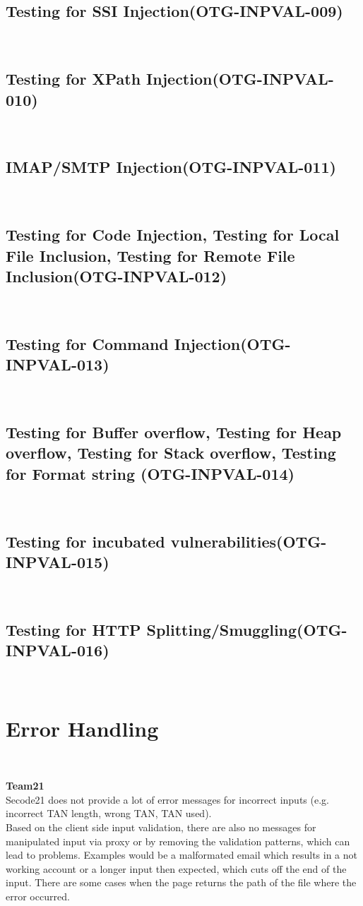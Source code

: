 \documentclass[headsepline,footsepline,footinclude=false,oneside,fontsize=11pt,paper=a4,listof=totoc,bibliography=totoc]{scrbook} %
\begin{document}
\subsection{Testing for SSI Injection(OTG-INPVAL-009)}\
\pagebreak
\subsection{Testing for XPath Injection(OTG-INPVAL-010)}\
\pagebreak
\subsection{IMAP/SMTP Injection(OTG-INPVAL-011)}\
\pagebreak
\subsection{Testing for Code Injection, Testing for Local File Inclusion, Testing for Remote File Inclusion(OTG-INPVAL-012)}\
\pagebreak
\subsection{Testing for Command Injection(OTG-INPVAL-013)}\
\pagebreak
\subsection{Testing for Buffer overflow, Testing for Heap overflow, Testing for Stack overflow, Testing for Format string (OTG-INPVAL-014)}\
\pagebreak
\subsection{Testing for incubated vulnerabilities(OTG-INPVAL-015)}\
\pagebreak
\subsection{Testing for HTTP Splitting/Smuggling(OTG-INPVAL-016)}\

\section{Error Handling}\

\textbf{Team21}\\

Secode21 does not provide a lot of error messages for incorrect inputs (e.g. incorrect TAN
length, wrong TAN, TAN used). \\
Based on the client side input validation, there are also no messages for manipulated input
via proxy or by removing the validation patterns, which can lead to problems. Examples would
be a malformated email which results in a not working account or a longer input then expected,
which cuts off the end of the input. There are some cases when the page returns the path of the
file where the error occurred.\\
\end{document}
